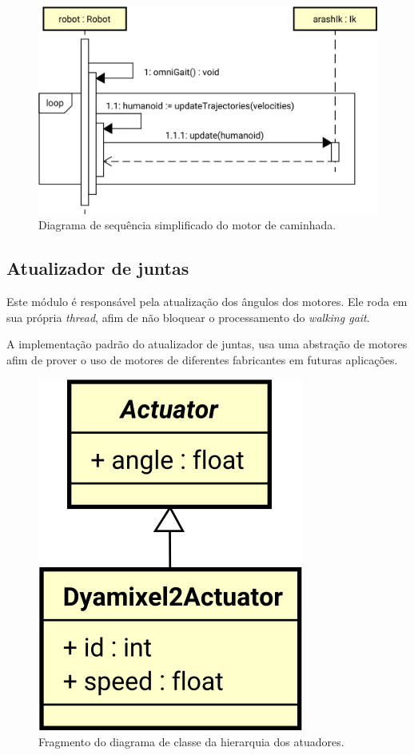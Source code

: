 \begin{figure}[htb]
	\centering
	\includegraphics[scale=0.5]{imagens/svg/walkinggait-walkingengine-sequence}
	\caption{Diagrama de sequência simplificado do motor de caminhada.}
	\label{fig:architecture:walkinggait:walkengine:sequence}
\end{figure}

\subsection{Atualizador de juntas}
\label{subsec:architecture:walkinggait:jointsupdater}

Este módulo é responsável pela atualização dos ângulos dos motores. Ele roda em sua própria \textit{thread}, afim de não bloquear o processamento do \textit{walking gait}.

A implementação padrão do atualizador de juntas, usa uma abstração de motores afim de prover o uso de motores de diferentes fabricantes em futuras aplicações.

\begin{figure}[htb]
	\centering
	\includegraphics[scale=0.6]{imagens/svg/softwarearchitecture-actuators-hierarchy}
	\caption{Fragmento do diagrama de classe da hierarquia dos atuadores.}
	\label{fig:architecture:actuator:classdiagram}
\end{figure}


